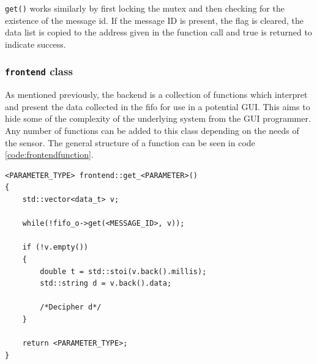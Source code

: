 \texttt{get()} works similarly by first locking the mutex and then checking for the existence of the message id.
If the message ID is present, the flag is cleared, the data list is copied to the address given in the function call and true is returned to indicate success.

\subsubsection*{\texttt{frontend} class}
As mentioned previously, the backend is a collection of functions which interpret and present the data collected in the fifo for use in a potential GUI.
This aims to hide some of the complexity of the underlying system from the GUI programmer.
Any number of functions can be added to this class depending on the needs of the sensor.
The general structure of a function can be seen in code \ref{code:frontendfunction}.

\begin{lstlisting}[caption=Function template for accesing data in fifo.,label=code:frontendfunction]
<PARAMETER_TYPE> frontend::get_<PARAMETER>()
{
	std::vector<data_t> v;

	while(!fifo_o->get(<MESSAGE_ID>, v));

	if (!v.empty())
	{
		double t = std::stoi(v.back().millis);
		std::string d = v.back().data;

		/*Decipher d*/
	}

	return <PARAMETER_TYPE>;
}
\end{lstlisting}